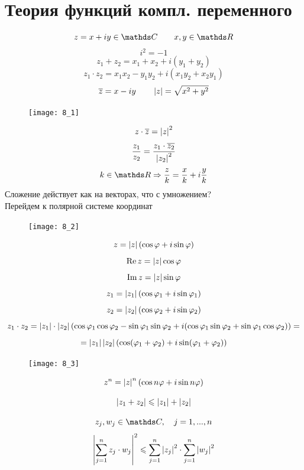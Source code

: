 \documentclass[main]{subfiles}
\begin{document}
	\newpage
	\section{Теория функций компл. переменного}
	\begin{Reminder}
	    \[z = x + iy \in \CC \qq x, y \in \R\]
		\[i^2 = -1\]
		\[z_1 + z_2 = x_1 + x_2 + i(y_1 + y_2)\]
		\[z_1 \cdot z_2 = x_1 x_2 - y_1 y_2 + i(x_1 y_2  + x_2 y_1)\]
		\[\overline{z} = x - iy \qquad \left|z\right| = \sqrt{x^2 + y^2}\]
		\begin{figure}[H]
	        \centering
	        \texttt{[image: 8\_1]}
		\end{figure}
		\[z \cdot \overline{z} = \left|z\right|^2\]
		\[\frac{z_1}{z_2} = \frac{z_1 \cdot \overline{z_2}}{\left|z_2\right|^2}\]
		\[k \in \R \Ra \frac{z}{k} = \frac{x}{k} + i \frac{y}{k}\]
		Сложение действует как на векторах, что с умножением?\\
		Перейдем к полярной системе координат
		\begin{figure}[H]
	        \centering
	        \texttt{[image: 8\_2]}
		\end{figure}
		\[z = \left|z\right| (\cos \varphi + i \sin \varphi)\]
		\[\mathop{\rm Re}\nolimits z = \left|z\right| \cos \varphi\]
		\[\mathop{\rm Im}\nolimits z = \left|z\right| \sin \varphi\]
		\[z_1 = \left|z_1\right| (\cos \varphi_1 + i \sin \varphi_1)\]
		\[z_2 = \left|z_2\right| (\cos \varphi_2 + i \sin \varphi_2)\]
		\[z_1 \cdot z_2 = \left|z_1\right| \cdot \left|z_2\right|
		(\cos \varphi_1 \cos \varphi_2 - \sin \varphi_1 \sin \varphi_2
	    +i(\cos \varphi_1 \sin \varphi_2 + \sin \varphi_1 \cos \varphi_2)) = \]
		\[ = \left|z_1\right| \left|z_2\right| (\cos(\varphi_1 + \varphi_2) +
		i \sin (\varphi_1 + \varphi_2))\]
		\begin{figure}[H]
	        \centering
	        \texttt{[image: 8\_3]}
		\end{figure}
	\end{Reminder}

	\begin{Theorem} [Ф-ла Муавра]
		\[z^n = \left|z\right|^n (\cos{n \varphi} + i \sin n \varphi )\]
	\end{Theorem}

	\begin{Definition} [н-во \bigtriangleup]
		\[\left|z_1 + z_2\right| \leqslant \left|z_1\right| + \left|z_2\right|\]
	\end{Definition}

	\begin{Definition} [н-во Коши]
	    \[z_j, w_j \in \CC, \q j = 1, ..., n\]
		\[\left|\sum_{j = 1}^n z_j \cdot w_j\right|^2 \leqslant \sum_{j = 1}^n
		\left|z_j\right|^2 \cdot \sum_{j = 1}^n \left|w_j\right|^2 \]
	\end{Definition}
\end{document}
